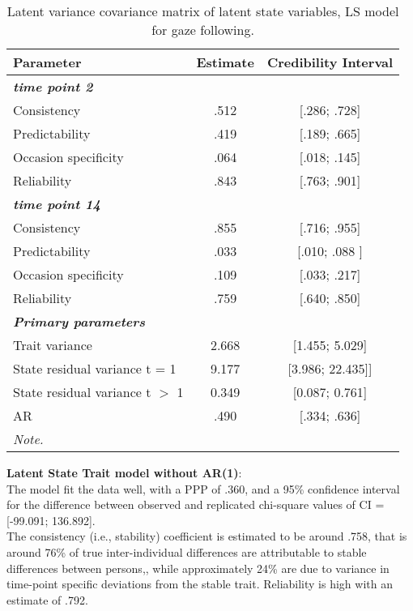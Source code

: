 \begin{table}[H]
 \setlength{\tabcolsep}{1mm}
 \begin{center}
        \caption[Correlation latent State gaze]{Latent variance covariance matrix of latent state variables, LS model for gaze following.}
        \label{Tab: correlations LS gaze}
            {\footnotesize
            \begin{tabular}{lcc}
            \hline    
          Parameter & Estimate & Credibility Interval\\
         \hline 
         \textbf{\textit{time point 2}} & & \\
           Consistency & .512 & [.286; .728] \\
           Predictability& .419& [.189; .665]\\
           Occasion specificity & .064&[.018; .145] \\
           Reliability &.843& [.763; .901] \\
             \textbf{\textit{time point 14}} & & \\
           Consistency & .855 &[.716; .955] \\
           Predictability& .033&[.010; .088 ] \\
           Occasion specificity & .109&[.033; .217] \\
           Reliability &.759& [.640; .850] \\
            \textbf{\textit{Primary parameters}} & & \\
            Trait variance & 2.668& [1.455; 5.029] \\
             State residual variance t = 1 &  9.177 & [3.986; 22.435]] \\
             State residual variance  t $>$ 1 & 0.349 & [0.087; 0.761] \\
              AR  & .490 & [.334; .636] \\
 \hline 
\multicolumn{3}{p{0.4\textwidth}}{\scriptsize{\textit{Note.}}} \\
            \end{tabular}}
        \end{center}
        \end{table}



  \textbf{Latent State Trait model without AR(1)}: \\
The model fit the data well, with a PPP of .360, and a 95\% confidence interval for the difference between observed and replicated chi-square values of CI = [-99.091; 136.892]. \\
The consistency (i.e., stability) coefficient is estimated to be around .758, that is around 76\% of true inter-individual differences are attributable to stable differences between persons,, while approximately 24\% are due to variance in time-point specific deviations from the stable trait. Reliability is high with an estimate of .792.

